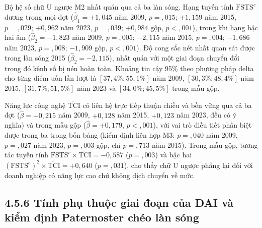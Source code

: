 \documentclass[
  a4paper,
  13pt]{extreport}
\begin{document}
Bộ hệ số chữ U ngược M2 nhất quán qua cả ba làn sóng. Hạng tuyến tính
\(\mathrm{FSTS}^{c}\) dương trong mọi đợt (\(\hat{\beta}_1 = +1{,}045\)
năm 2009, \(p = {,}015\); \(+1{,}159\) năm 2015, \(p = {,}029\);
\(+0{,}962\) năm 2023, \(p = {,}039\); \(+0{,}984\) gộp,
\(p < {,}001\)), trong khi hạng bậc hai âm (\(\hat{\beta}_2 = -1{,}823\)
năm 2009, \(p = {,}005\); \(-2{,}115\) năm 2015, \(p = {,}004\);
\(-1{,}686\) năm 2023, \(p = {,}008\); \(-1{,}909\) gộp,
\(p < {,}001\)). Độ cong sắc nét nhất quan sát được trong làn sóng 2015
(\(\hat{\beta}_2 = -2{,}115\)), nhất quán với một giai đoạn chuyển đổi
trong đó kênh số bị nén hoàn toàn. Khoảng tin cậy 95\% theo phương pháp
delta cho từng điểm uốn lần lượt là \([37{,}4\%; 55{,}1\%]\) năm 2009,
\([30{,}3\%; 48{,}4\%]\) năm 2015, \([31{,}7\%; 51{,}5\%]\) năm 2023 và
\([34{,}0\%; 45{,}5\%]\) trong mẫu gộp.

Năng lực công nghệ \(\tilde{\mathrm{TCI}}\) có liên hệ trực tiếp thuận
chiều và bền vững qua cả ba đợt (\(\hat{\beta} = +0{,}215\) năm 2009,
\(+0{,}128\) năm 2015, \(+0{,}123\) năm 2023, đều có ý nghĩa) và trong
mẫu gộp (\(\hat{\beta} = +0{,}179\), \(p < {,}001\)), với vai trò điều
tiết phân biệt được trong ba trong bốn bảng (kiểm định liên hợp M3:
\(p = {,}040\) năm 2009, \(p = {,}027\) năm 2023, \(p = {,}003\) gộp,
chỉ \(p = {,}713\) năm 2015). Trong mẫu gộp, tương tác tuyến tính
\(\mathrm{FSTS}^{c} \times \tilde{\mathrm{TCI}} = -0{,}587\)
(\(p = {,}003\)) và bậc hai
\((\mathrm{FSTS}^{c})^2 \times \tilde{\mathrm{TCI}} = +0{,}640\)
(\(p = {,}031\)), cho thấy chữ U ngược phẳng lại đối với doanh nghiệp có
năng lực cao chứ không dịch chuyển về mức.

\hypertarget{tuxednh-phux1ee5-thuux1ed9c-giai-ux111oux1ea1n-cux1ee7a-dai-vuxe0-kiux1ec3m-ux111ux1ecbnh-paternoster-chuxe9o-luxe0n-suxf3ng}{%
\subsection{4.5.6 Tính phụ thuộc giai đoạn của DAI và kiểm định
Paternoster chéo làn
sóng}\label{tuxednh-phux1ee5-thuux1ed9c-giai-ux111oux1ea1n-cux1ee7a-dai-vuxe0-kiux1ec3m-ux111ux1ecbnh-paternoster-chuxe9o-luxe0n-suxf3ng}}
\end{document}
